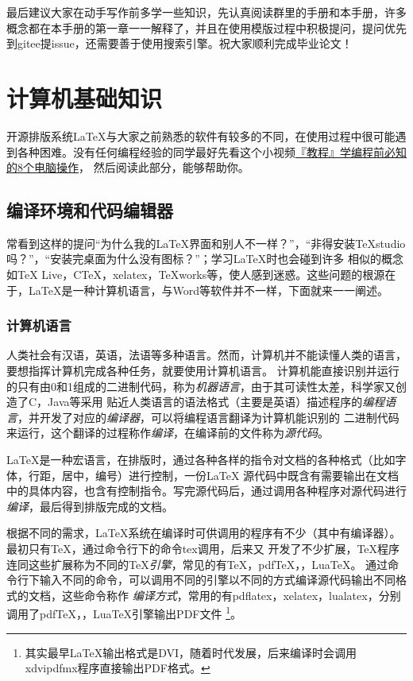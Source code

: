 \begin{enumerate}
 
\end{enumerate}

最后建议大家在动手写作前多学一些知识，先认真阅读群里的手册和本手册，许多概念都在本手册的第一章一一解释了，并且在使用模版过程中积极提问，提问优先到gitee提issue，还需要善于使用搜索引擎。祝大家顺利完成毕业论文！
\newpage
\section{计算机基础知识}


开源排版系统\LaTeX{}与大家之前熟悉的软件有较多的不同，在使用过程中很可能遇到各种困难。没有任何编程经验的同学最好先看这个小视频\href{https://www.bilibili.com/video/BV1t4411v78E?from=search&seid=5662014810176309518&spm_id_from=333.337.0.0}{『教程』学编程前必知的8个电脑操作}，
然后阅读此部分，能够帮助你。


\subsection{编译环境和代码编辑器}\label{sub:by}
常看到这样的提问“为什么我的\LaTeX{}界面和别人不一样？”，“非得安装TeXstudio吗？”，“安装完桌面为什么没有图标？”；学习LaTeX时也会碰到许多
相似的概念如\TeX{} Live，C\TeX{}，xelatex，TeXworks等，使人感到迷惑。这些问题的根源在于，\LaTeX{}是一种计算机语言，与Word等软件并不一样，下面就来一一阐述。



\subsubsection{计算机语言}\label{subsub:yy}

人类社会有汉语，英语，法语等多种语言。然而，计算机并不能读懂人类的语言，要想指挥计算机完成各种任务，就要使用计算机语言。
计算机能直接识别并运行的只有由0和1组成的二进制代码，称为\emph{机器语言}，由于其可读性太差，科学家又创造了C，Java等采用
贴近人类语言的语法格式（主要是英语）描述程序的\emph{编程语言}，并开发了对应的\emph{编译器}，可以将编程语言翻译为计算机能识别的
二进制代码来运行，这个翻译的过程称作\emph{编译}，在编译前的文件称为\emph{源代码}。

\LaTeX{}是一种宏语言，在排版时，通过各种各样的指令对文档的各种格式（比如字体，行距，居中，编号）进行控制，一份\LaTeX{}
源代码中既含有需要输出在文档中的具体内容，也含有控制指令。写完源代码后，通过调用各种程序对源代码进行\emph{编译}，最后得到排版完成的文档。

根据不同的需求，\LaTeX{}系统在编译时可供调用的程序有不少（其中有编译器）。最初只有\TeX{}，通过命令行下的命令tex调用，后来又
开发了不少扩展，\TeX{}程序连同这些扩展称为不同的\TeX{}\emph{引擎}，常见的有\TeX{}，pdf\TeX{}，\XeTeX{}，Lua\TeX{}。
通过命令行下输入不同的命令，可以调用不同的引擎以不同的方式编译源代码输出不同格式的文档，这些命令称作
\emph{编译方式}，常用的有pdflatex，xelatex，lualatex，分别调用了pdf\TeX{}，\XeTeX{}，Lua\TeX{}引擎输出PDF文件
\footnote{其实最早\LaTeX{}输出格式是DVI，随着时代发展，后来编译时会调用xdvipdfmx程序直接输出PDF格式。}。


